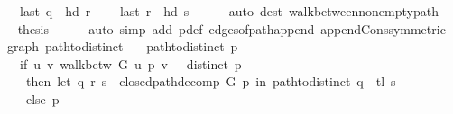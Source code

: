 \begin{isabellebody}
\ \ \ \ {\isachardoublequoteopen}last\ q\ {\isacharequal}{\kern0pt}\ hd\ r{\isachardoublequoteclose}\isanewline
\ \ \ \ {\isachardoublequoteopen}last\ r\ {\isacharequal}{\kern0pt}\ hd\ s{\isachardoublequoteclose}\isanewline
\ \ \ \ \isamarkupfalse%
\ {\isacharparenleft}{\kern0pt}auto\ dest{\isacharcolon}{\kern0pt}\ walk{\isacharunderscore}{\kern0pt}between{\isacharunderscore}{\kern0pt}nonempty{\isacharunderscore}{\kern0pt}path{\isacharparenleft}{\kern0pt}{}{\isacharminus}{\kern0pt}{}{\isacharparenright}{\kern0pt}{\isacharparenright}{\kern0pt}\isanewline
\ \ \isamarkupfalse%
\ {\isacharquery}{\kern0pt}thesis\isanewline
\ \ \ \ \isamarkupfalse%
\ {\isacharparenleft}{\kern0pt}auto\ simp\ add{\isacharcolon}{\kern0pt}\ p{\isacharunderscore}{\kern0pt}def\ edges{\isacharunderscore}{\kern0pt}of{\isacharunderscore}{\kern0pt}path{\isacharunderscore}{\kern0pt}append{\isacharunderscore}{\kern0pt}{}\ append{\isacharunderscore}{\kern0pt}Cons{\isacharbrackleft}{\kern0pt}symmetric{\isacharbrackright}{\kern0pt}{\isacharparenright}{\kern0pt}\isanewline
{}\isamarkupfalse%
%
\endisatagproof
{\isafoldproof}%
%
\isadelimproof
\isanewline
%
\endisadelimproof
%
\isadeliminvisible
\isanewline
%
\endisadeliminvisible
%
\isataginvisible
{}\isamarkupfalse%
\ {\isacharparenleft}{\kern0pt}\ graph{\isacharparenright}{\kern0pt}\ path{\isacharunderscore}{\kern0pt}to{\isacharunderscore}{\kern0pt}distinct\ \isanewline
\ \ {\isachardoublequoteopen}path{\isacharunderscore}{\kern0pt}to{\isacharunderscore}{\kern0pt}distinct\ p\ {\isacharequal}{\kern0pt}\isanewline
\ \ \ \ {\isacharparenleft}{\kern0pt}if\ {\isacharparenleft}{\kern0pt}{\isasymexists}u\ v{\isachardot}{\kern0pt}\ walk{\isacharunderscore}{\kern0pt}betw\ G\ u\ p\ v{\isacharparenright}{\kern0pt}\ {\isasymand}\ {\isasymnot}\ distinct\ p\isanewline
\ \ \ \ \ then\ let\ {\isacharparenleft}{\kern0pt}q{\isacharcomma}{\kern0pt}\ r{\isacharcomma}{\kern0pt}\ s{\isacharparenright}{\kern0pt}\ {\isacharequal}{\kern0pt}\ closed{\isacharunderscore}{\kern0pt}path{\isacharunderscore}{\kern0pt}decomp\ G\ p\ in\ path{\isacharunderscore}{\kern0pt}to{\isacharunderscore}{\kern0pt}distinct\ {\isacharparenleft}{\kern0pt}q\ {\isacharat}{\kern0pt}\ tl\ s{\isacharparenright}{\kern0pt}\isanewline
\ \ \ \ \ else\ p{\isacharparenright}{\kern0pt}{\isachardoublequoteclose}%
\endisataginvisible
{\isafoldinvisible}%
%
\isadeliminvisible
\isanewline
%
\endisadeliminvisible
%
\isadelimproof
\ \ %
\endisadelimproof
%
\isatagproof

\end{isabellebody}
